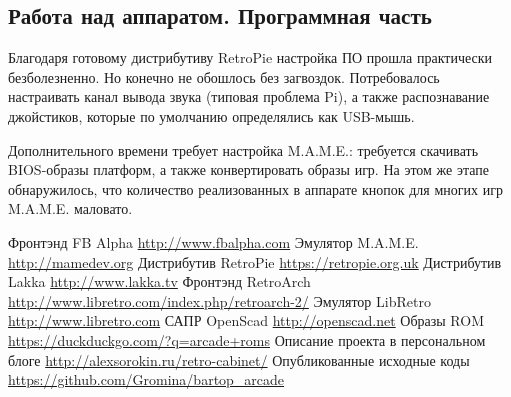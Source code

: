 \documentclass[10pt, a5paper]{article}
\begin{document}
\subsection*{Работа над аппаратом. Программная часть}

Благодаря готовому дистрибутиву RetroPie настройка ПО прошла практически безболезненно. Но конечно не обошлось без загвоздок.
Потребовалось настраивать канал вывода звука (типовая проблема Pi), а также распознавание джойстиков, которые по умолчанию определялись как USB-мышь.

Дополнительного времени требует настройка M.A.M.E.: требуется скачивать BIOS-образы платформ,  а также конвертировать образы игр.
На этом же этапе обнаружилось, что количество реализованных в аппарате кнопок для многих игр M.A.M.E. маловато.

\begin{thebibliography}{99}
Фронтэнд FB Alpha \url{http://www.fbalpha.com}
Эмулятор M.A.M.E. \url{http://mamedev.org}
Дистрибутив RetroPie \url{https://retropie.org.uk}
Дистрибутив Lakka \url{http://www.lakka.tv}
Фронтэнд RetroArch \url{http://www.libretro.com/index.php/retroarch-2/}
Эмулятор LibRetro \url{http://www.libretro.com}
САПР OpenScad \url{http://openscad.net}
Образы ROM \url{https://duckduckgo.com/?q=arcade+roms}
Описание проекта в персональном блоге  \url{http://alexsorokin.ru/retro-cabinet/}
Опубликованные исходные коды \url{https://github.com/Gromina/bartop\_arcade}
\end{thebibliography}
\end{document}

